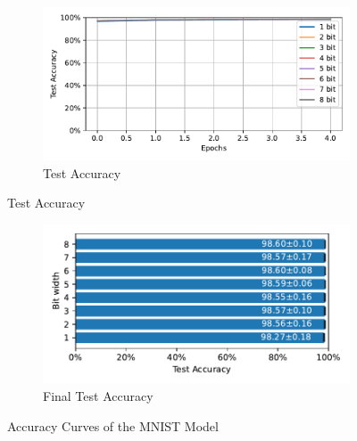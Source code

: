         \begin{figure}[H]
            \centering
            \ContinuedFloat
            \begin{subfigure}[H]{\textwidth}
                \centering
                \includegraphics[width=\textwidth]{../standard/MNIST/plots/mnist_test_acc.pdf}
                \caption{Test Accuracy}
            \end{subfigure}
        \end{figure}
        \begin{figure}[H]
            \centering
            \ContinuedFloat
            \begin{subfigure}[H]{\textwidth}
                \centering
                \includegraphics[width=\textwidth]{../standard/MNIST/plots/mnist_final_acc_horizontal.pdf}
                \caption{Final Test Accuracy}
            \end{subfigure}
            \caption{Accuracy Curves of the MNIST Model}
        \end{figure}
    
